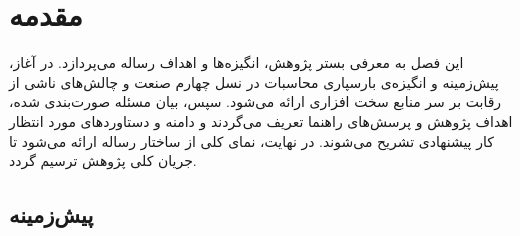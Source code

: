 
\chapter{مقدمه}

این فصل به معرفی بستر پژوهش، انگیزه‌ها و اهداف رساله می‌پردازد. در آغاز، پیش‌زمینه و انگیزه‌ی بارسپاری محاسبات در نسل چهارم صنعت و چالش‌های ناشی از رقابت بر سر منابع سخت افزاری ارائه می‌شود. سپس، بیان مسئله صورت‌بندی شده، اهداف پژوهش و پرسش‌های راهنما تعریف می‌گردند و دامنه و دستاوردهای مورد انتظار کار پیشنهادی تشریح می‌شوند. در نهایت، نمای کلی از ساختار رساله ارائه می‌شود تا جریان کلی پژوهش ترسیم گردد.

\section{پیش‌زمینه}

